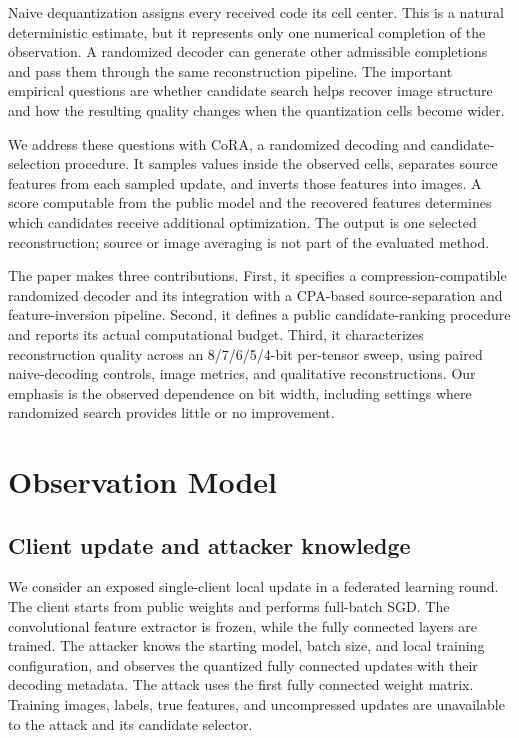 \documentclass{article}
\newcommand{\cora}{CoRA}
\begin{document}
Naive dequantization assigns every received code its cell center. This is
a natural deterministic estimate, but it represents only one numerical
completion of the observation. A randomized decoder can generate other
admissible completions and pass them through the same reconstruction
pipeline. The important empirical questions are whether candidate search
helps recover image structure and how the resulting quality changes when
the quantization cells become wider.

We address these questions with \cora{}, a randomized decoding and
candidate-selection procedure. It samples values inside the observed
cells, separates source features from each sampled update, and inverts
those features into images. A score computable from the public model and
the recovered features determines which candidates receive additional
optimization. The output is one selected reconstruction; source or image
averaging is not part of the evaluated method.

The paper makes three contributions. First, it specifies a
compression-compatible randomized decoder and its integration with a
CPA-based source-separation and feature-inversion pipeline. Second, it
defines a public candidate-ranking procedure and reports its actual
computational budget. Third, it characterizes reconstruction quality
across an 8/7/6/5/4-bit per-tensor sweep, using paired naive-decoding
controls, image metrics, and qualitative reconstructions. Our emphasis
is the observed dependence on bit width, including settings where
randomized search provides little or no improvement.

\section{Observation Model}
\label{sec:observation}
\subsection{Client update and attacker knowledge}
We consider an exposed single-client local update in a federated learning
round. The client starts from public weights and performs full-batch SGD.
The convolutional feature extractor is frozen, while the fully connected
layers are trained. The attacker knows the starting model, batch size,
and local training configuration, and observes the quantized fully
connected updates with their decoding metadata. The attack uses the
first fully connected weight matrix. Training images, labels, true
features, and uncompressed updates are unavailable to the attack and its
candidate selector.
\end{document}
